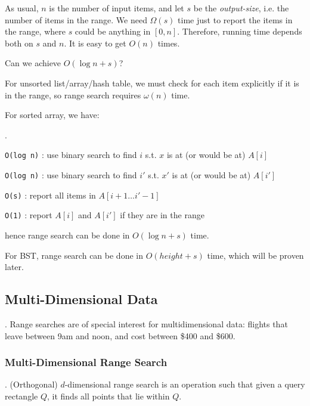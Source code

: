 \documentclass{article}
\begin{document}
As usual, $n$ is the number of input items, and let $s$ be the \textit{output-size}, i.e. the number of items in the range. We need $\Omega(s)$ time just to report the items in the range, where $s$ could be anything in $[0, n]$. Therefore, running time depends both on $s$ and $n$. It is easy to get $O(n)$ times. 

\begin{Question}{}
    Can we achieve $O(\log n + s)$? 
\end{Question}

\begin{solution}
    For unsorted list/array/hash table, we must check for each item explicitly if it is in the range, so range search requires $\omega(n)$ time. 

    For sorted array, we have: \begin{algo}[].
        \vspace{-.7cm}
        \item[\texttt{O(log n)}]: use binary search to find $i$ s.t. $x$ is at (or would be at) $A[i]$
        \item[\texttt{O(log n)}]: use binary search to find $i'$ s.t. $x'$ is at (or would be at) $A[i']$
        \item[\texttt{O(s)}]: report all items in $A[i + 1 \ldots i' - 1]$
        \item[\texttt{O(1)}]: report $A[i]$ and $A[i']$ if they are in the range
    \end{algo}
    hence range search can be done in $O(\log n + s)$ time. 

    For BST, range search can be done in $O(height + s)$ time, which will be proven later. 
\end{solution}

\subsection{Multi-Dimensional Data} 

\begin{comm}[].
    Range searches are of special interest for multidimensional data: flights that leave between 9am and noon, and cost between \$400 and \$600. 
\end{comm}

\subsubsection{Multi-Dimensional Range Search}

\begin{deff}.
    (Orthogonal) $d$-dimensional range search is an operation such that given a query rectangle $Q$, it finds all points that lie within $Q$. 
\end{deff}
\end{document}
